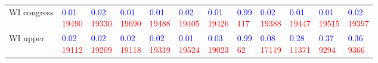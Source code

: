 \begin{tabular}{llllllllllll}
WI congress &  \makecell{\textcolor{blue}{0.01} \\ \textcolor{red}{19490}} &  \makecell{\textcolor{blue}{0.02} \\ \textcolor{red}{19330}} &  \makecell{\textcolor{blue}{0.01} \\ \textcolor{red}{19690}} &  \makecell{\textcolor{blue}{0.01} \\ \textcolor{red}{19488}} &  \makecell{\textcolor{blue}{0.02} \\ \textcolor{red}{19405}} &  \makecell{\textcolor{blue}{0.01} \\ \textcolor{red}{19426}} &  \makecell{\textcolor{blue}{0.99} \\ \textcolor{red}{117}} &  \makecell{\textcolor{blue}{0.02} \\ \textcolor{red}{19388}} &  \makecell{\textcolor{blue}{0.01} \\ \textcolor{red}{19447}} &  \makecell{\textcolor{blue}{0.01} \\ \textcolor{red}{19515}} &  \makecell{\textcolor{blue}{0.02} \\ \textcolor{red}{19397}} \\
WI upper    &  \makecell{\textcolor{blue}{0.02} \\ \textcolor{red}{19112}} &  \makecell{\textcolor{blue}{0.02} \\ \textcolor{red}{19209}} &  \makecell{\textcolor{blue}{0.02} \\ \textcolor{red}{19118}} &  \makecell{\textcolor{blue}{0.02} \\ \textcolor{red}{19319}} &  \makecell{\textcolor{blue}{0.01} \\ \textcolor{red}{19524}} &  \makecell{\textcolor{blue}{0.03} \\ \textcolor{red}{19023}} &   \makecell{\textcolor{blue}{0.99} \\ \textcolor{red}{62}} &  \makecell{\textcolor{blue}{0.08} \\ \textcolor{red}{17119}} &  \makecell{\textcolor{blue}{0.28} \\ \textcolor{red}{11371}} &   \makecell{\textcolor{blue}{0.37} \\ \textcolor{red}{9294}} &   \makecell{\textcolor{blue}{0.36} \\ \textcolor{red}{9366}} \\

\end{tabular}
